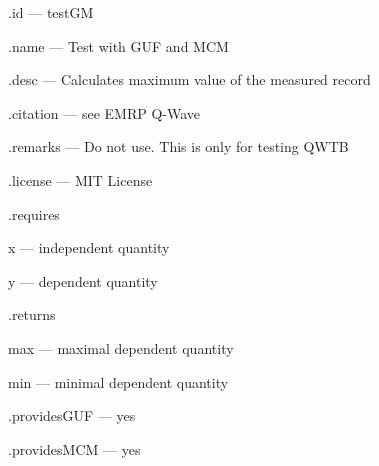 \begin{tightdesc}
\item [\textsf{.id}] --- testGM
\item [\textsf{.name}] --- Test with GUF and MCM
\item [\textsf{.desc}] --- Calculates maximum value of the measured record
\item [\textsf{.citation}] --- see EMRP Q-Wave
\item [\textsf{.remarks}] --- Do not use. This is only for testing QWTB
\item [\textsf{.license}] --- MIT License
\item [\textsf{.requires}] \rule{0em}{0em}
\begin{tightdesc}
\item [\textsf{x}] --- independent quantity
\item [\textsf{y}] --- dependent quantity
\end{tightdesc}
\item [\textsf{.returns}] \rule{0em}{0em}
\begin{tightdesc}
\item [\textsf{max}] --- maximal dependent quantity
\item [\textsf{min}] --- minimal dependent quantity
\end{tightdesc}
\item [\textsf{.providesGUF}] --- yes
\item [\textsf{.providesMCM}] ---  yes
\end{tightdesc}
